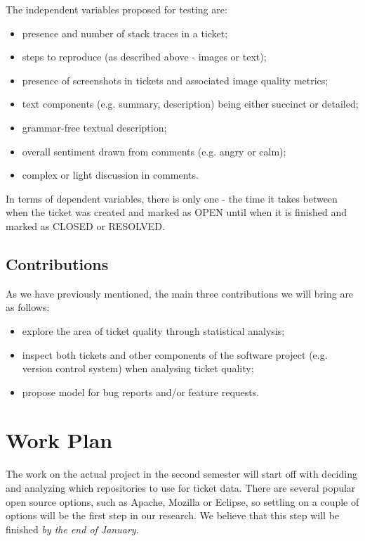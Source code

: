 \documentclass{mprop}
\begin{document}
The independent variables proposed for testing are:
  \begin{itemize}
    \item presence and number of stack traces in a ticket;
    \item steps to reproduce (as described above - images or text);
    \item presence of screenshots in tickets and associated image quality metrics;
    \item text components (e.g. summary, description) being either 
      succinct or detailed;
    \item grammar-free textual description;
    \item overall sentiment drawn from comments (e.g. angry or calm);
    \item complex or light discussion in comments.
  \end{itemize}

In terms of dependent variables, there is only one - the time it takes
between when the ticket was created and marked as OPEN until when it
is finished and marked as CLOSED or RESOLVED.

\subsection{Contributions}\label{contributions}

As we have previously mentioned, the main three contributions we will 
bring are as follows:
  \begin{itemize}
    \item explore the area of ticket quality through statistical analysis;
    \item inspect both tickets and other components of the software project
      (e.g. version control system) when analysing ticket quality;
    \item propose model for bug reports and/or feature requests.
  \end{itemize}

\section{Work Plan}\label{work_plan}

The work on the actual project in the second semester will start off 
with deciding and analyzing which repositories to use for ticket data.
There are several popular open source options, such as Apache, Mozilla or
Eclipse, so settling on a couple of options will be the first step in our
research. We believe that this step will be finished \emph{by the end of
January}.
\end{document}
